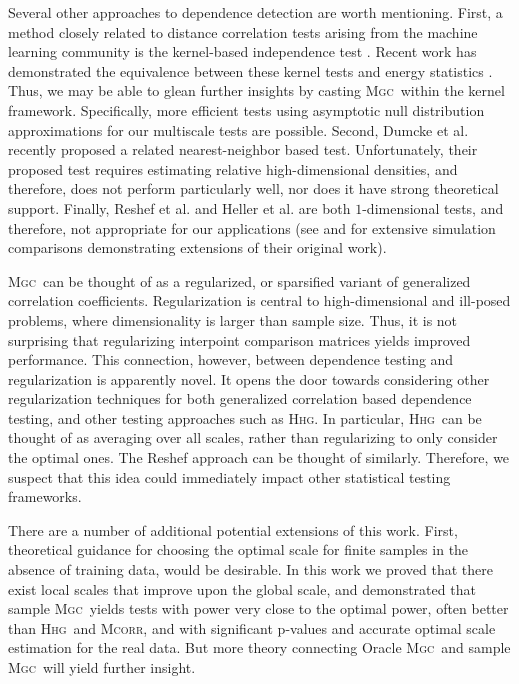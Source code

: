 \documentclass[11pt]{article}
\providecommand{\sct}[1]{{\normalfont\textsc{#1}}}
\newcommand{\Mgc}{\sct{Mgc}}
\newcommand{\Hhg}{\sct{Hhg}}
\newcommand{\Mcorr}{\sct{Mcorr}}
\begin{document}
Several other approaches to dependence detection are worth mentioning.
First, a method closely related to distance correlation tests arising from the machine learning community is the kernel-based independence test  \cite{GrettonEtAl2005, GrettonGyorfi2010, GrettonEtAl2012}.  Recent work has demonstrated the equivalence between these kernel tests and  energy statistics  \cite{SejdinovicEtAl2013, RamdasEtAl2015}. Thus, we may be able to glean further insights by casting \Mgc~within the kernel framework. Specifically, more efficient tests using asymptotic null distribution approximations for our multiscale tests are possible.
Second, Dumcke et al. \cite{Dumcke2014} recently proposed a related nearest-neighbor based test.  Unfortunately, their proposed test requires estimating relative high-dimensional densities, and therefore, does not perform particularly well, nor does it have strong theoretical support.
Finally, Reshef et al. \cite{Reshef2011} and Heller et al. \cite{heller2016consistent} are both $1$-dimensional tests, and therefore, not appropriate for our applications (see \cite{SimonTibshirani2012} and \cite{reshef2015empirical} for extensive simulation comparisons demonstrating extensions of their original work).




 \Mgc~can be thought of as a regularized, or sparsified variant of generalized correlation coefficients.  Regularization is central to high-dimensional and ill-posed problems, where dimensionality is larger than sample size.  Thus, it is not surprising that regularizing interpoint comparison matrices yields improved performance.  This connection, however, between dependence testing and regularization is apparently novel.  It opens the door towards considering other regularization techniques for both generalized correlation based dependence testing, and other testing approaches such as \Hhg. In particular, \Hhg~can be thought of as averaging over all scales, rather than regularizing to only consider the optimal ones. The Reshef approach can be thought of similarly.  Therefore, we suspect that this idea could immediately impact other statistical testing frameworks.



There are a number of additional potential extensions of this work.  First, theoretical guidance for choosing the optimal scale for finite samples  in the absence of training data, would be desirable. 
In this work we proved that there exist local scales that improve upon the global scale, and demonstrated that sample \Mgc~yields tests with power very close to the optimal power, often better than \Hhg~and \Mcorr, and with significant p-values and accurate optimal scale estimation for the real data.  But more theory connecting Oracle \Mgc~and  sample \Mgc~will yield further insight.
\end{document}
